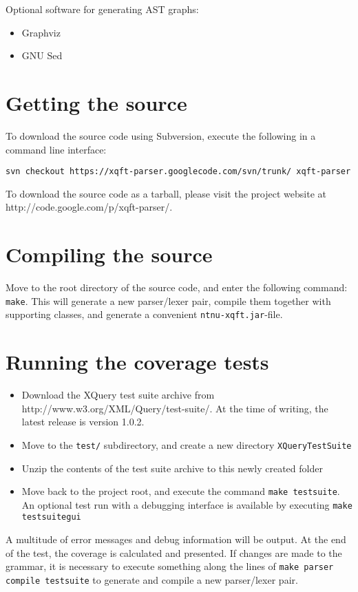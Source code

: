 Optional software for generating AST graphs:
\begin{itemize}
  \item Graphviz
  \item GNU Sed
\end{itemize}

\section{Getting the source}
To download the source code using Subversion, execute the following in a
command line interface:

\verb!svn checkout https://xqft-parser.googlecode.com/svn/trunk/ xqft-parser!

To download the source code as a tarball, please visit the project website at
http://code.google.com/p/xqft-parser/.

\section{Compiling the source}
Move to the root directory of the source code, and enter the following command:
\verb!make!. This will generate a new parser/lexer pair, compile them together
with supporting classes, and generate a convenient \verb!ntnu-xqft.jar!-file.

\section{Running the coverage tests}
\begin{itemize}
\item Download the XQuery test suite archive from
http://www.w3.org/XML/Query/test-suite/. At the time of writing, the latest
release is version 1.0.2. 
\item Move to the \verb!test/! subdirectory, and create a new directory
\verb!XQueryTestSuite!
\item Unzip the contents of the test suite archive to this newly created folder
\item Move back to the project root, and execute the command 
\verb!make testsuite!. An optional test run with a debugging interface is
available by executing \verb!make testsuitegui!
\end{itemize}

A multitude of error messages and debug information will be output. At the end
of the test, the coverage is calculated and presented. If changes are made to
the grammar, it is necessary to execute something along the lines of 
\verb!make parser compile testsuite! to generate and compile a new parser/lexer
pair.